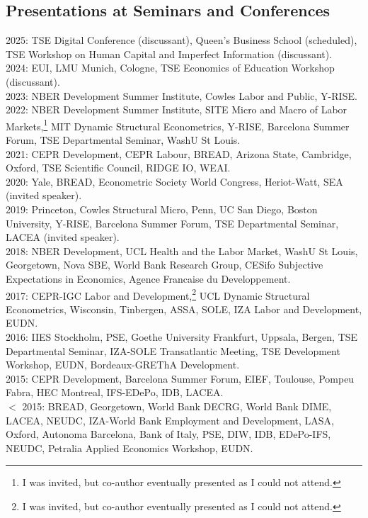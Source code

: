 \documentclass[12pt,english]{article}
\begin{document}
\subsection*{Presentations at Seminars and Conferences}
2025: TSE Digital Conference (discussant), Queen's Business School (scheduled), TSE Workshop on Human Capital and Imperfect Information (discussant).\vspace{0.2cm} \\
2024:  EUI, LMU Munich, Cologne, TSE Economics of Education Workshop (discussant). \vspace{0.2cm} \\
2023: NBER Development Summer Institute, Cowles Labor and Public, Y-RISE.\vspace{0.2cm} \\
2022: NBER Development Summer Institute, SITE Micro and Macro of Labor Markets,\footnote{I was invited, but co-author eventually presented as I could not attend.} MIT Dynamic Structural Econometrics, Y-RISE, Barcelona Summer Forum, TSE Departmental Seminar, WashU St Louis.\vspace{0.2cm} \\
2021: CEPR Development, CEPR Labour, BREAD, Arizona State, Cambridge, Oxford, TSE Scientific Council, RIDGE IO, WEAI.\vspace{0.2cm} \\
2020: Yale, BREAD, Econometric Society World Congress, Heriot-Watt, SEA (invited speaker). \vspace{0.2cm} \\
2019: Princeton, Cowles Structural Micro, Penn, UC San Diego, Boston University, Y-RISE, Barcelona Summer Forum, TSE Departmental Seminar, LACEA (invited speaker).\vspace{0.2cm} \\
2018: NBER Development, UCL Health and the Labor Market, WashU St Louis, Georgetown, Nova SBE, World Bank Research Group, CESifo Subjective Expectations in Economics, Agence Francaise du Developpement. \vspace{0.2cm} \\
2017: CEPR-IGC Labor and Development,\footnote{I was invited, but co-author eventually presented as I could not attend.} UCL Dynamic Structural Econometrics, Wisconsin, Tinbergen, ASSA, SOLE, IZA Labor and Development, EUDN.\vspace{0.2cm} \\
2016: IIES Stockholm, PSE, Goethe University Frankfurt, Uppsala, Bergen, TSE Departmental Seminar, IZA-SOLE Transatlantic Meeting, TSE Development Workshop, EUDN, Bordeaux-GREThA Development.\vspace{0.2cm} \\
2015:  CEPR Development, Barcelona Summer Forum, EIEF, Toulouse, Pompeu Fabra, HEC Montreal, IFS-EDePo, IDB, LACEA.  \vspace{0.2cm} \\
$<$ 2015: BREAD, Georgetown, World Bank DECRG, World Bank DIME, LACEA, NEUDC, IZA-World Bank Employment and Development, LASA, Oxford, Autonoma Barcelona, Bank of Italy, PSE, DIW, IDB, EDePo-IFS, NEUDC, Petralia Applied Economics Workshop, EUDN.  
\end{document}
